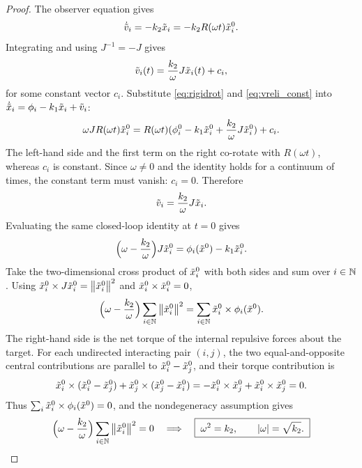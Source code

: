 \begin{proof}
The observer equation gives
\begin{equation}
  \dot{\tilde{v}}_i=-k_2\tilde{x}_i=-k_2R(\omega t)\tilde{x}_i^0 .
\end{equation}
Integrating and using $J^{-1}=-J$ gives
\begin{equation}
  \tilde{v}_i(t)=\frac{k_2}{\omega}J\tilde{x}_i(t)+c_i,
  \label{eq:vreli_const}
\end{equation}
for some constant vector $c_i$. Substitute \eqref{eq:rigidrot} and \eqref{eq:vreli_const} into
$\dot{\tilde{x}}_i=\phi_i-k_1\tilde{x}_i+\tilde{v}_i$:
\begin{equation}
  \omega J R(\omega t)\tilde{x}_i^0
  =R(\omega t)(\phi_i^0-k_1\tilde{x}_i^0+\frac{k_2}{\omega}J\tilde{x}_i^0)+c_i .
\end{equation}
The left-hand side and the first term on the right co-rotate with $R(\omega t)$, whereas $c_i$ is
constant. Since $\omega\ne0$ and the identity holds for a continuum of times, the constant term must
vanish: $c_i=0$. Therefore
\begin{equation}
  \tilde{v}_i=\frac{k_2}{\omega}J\tilde{x}_i .
  \label{eq:vreli}
\end{equation}
Evaluating the same closed-loop identity at $t=0$ gives
\begin{equation}
  \Bigl(\omega-\frac{k_2}{\omega}\Bigr)J\tilde{x}_i^0=\phi_i(\tilde{x}^0)-k_1\tilde{x}_i^0 .
  \label{eq:torque_eq}
\end{equation}
Take the two-dimensional cross product of $\tilde{x}_i^0$ with both sides and sum over $i\in\mathbb{N}$. Using
$\tilde{x}_i^0\times J\tilde{x}_i^0=\left\| \tilde{x}_i^0 \right\|^2$ and $\tilde{x}_i^0\times\tilde{x}_i^0=0$,
\begin{equation}
  \Bigl(\omega-\frac{k_2}{\omega}\Bigr)\sum_{i\in\mathbb{N}}\left\| \tilde{x}_i^0 \right\|^2
  =\sum_{i\in\mathbb{N}}\tilde{x}_i^0\times\phi_i(\tilde{x}^0) .
  \label{eq:torque_sum}
\end{equation}
The right-hand side is the net torque of the internal repulsive forces about the target. For each
undirected interacting pair $(i,j)$, the two equal-and-opposite central contributions are parallel to
$\tilde{x}_i^0-\tilde{x}_j^0$, and their torque contribution is
\begin{equation}
  \tilde{x}_i^0\times(\tilde{x}_i^0-\tilde{x}_j^0)+\tilde{x}_j^0\times(\tilde{x}_j^0-\tilde{x}_i^0)
  =-\tilde{x}_i^0\times\tilde{x}_j^0+\tilde{x}_i^0\times\tilde{x}_j^0=0 .
\end{equation}
Thus $\sum_i\tilde{x}_i^0\times\phi_i(\tilde{x}^0)=0$, and the nondegeneracy assumption gives
\begin{equation}
  \Bigl(\omega-\frac{k_2}{\omega}\Bigr)\sum_{i\in\mathbb{N}}\left\| \tilde{x}_i^0 \right\|^2=0
  \quad\Longrightarrow\quad
  \boxed{\;\omega^2=k_2,\qquad |\omega|=\sqrt{k_2}.\;}
  \label{eq:omega_pred}
\end{equation}
\end{proof}

